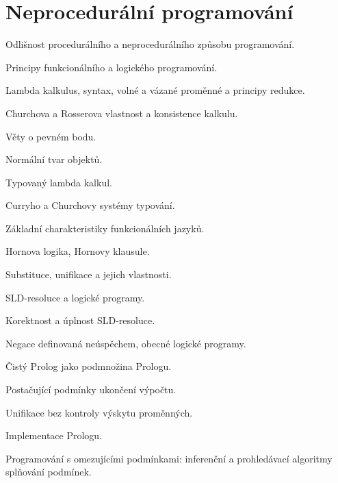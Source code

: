 \newpage
\section{Neprocedurální programování}
\begin{pozadavky}
\begin{pitemize}
\item Odlišnost procedurálního a neprocedurálního způsobu programování.
\item Principy funkcionálního a logického programování.
\item Lambda kalkulus, syntax, volné a vázané proměnné a principy redukce.
\item Churchova a Rosserova vlastnost a konsistence kalkulu.
\item Věty o pevném bodu.
\item Normální tvar objektů.
\item Typovaný lambda kalkul.
\item Curryho a Churchovy systémy typování.
\item Základní charakteristiky funkcionálních jazyků.
\item Hornova logika, Hornovy klausule.
\item Substituce, unifikace a jejich vlastnosti.
\item SLD-resoluce a logické programy.
\item Korektnost a úplnost SLD-resoluce.
\item Negace definovaná neúspěchem, obecné logické programy.
\item Čistý Prolog jako podmnožina Prologu.
\item Postačující podmínky ukončení výpočtu.
\item Unifikace bez kontroly výskytu proměnných.
\item Implementace Prologu.
\item Programování s omezujícími podmínkami: inferenční a prohledávací algoritmy splňování podmínek.
\end{pitemize}
\end{pozadavky}